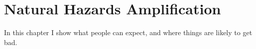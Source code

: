 \setchapterpreamble[u]{\margintoc}
\chapter{Natural Hazards Amplification}

In this chapter I show what people can expect, and where things are likely to get bad. 